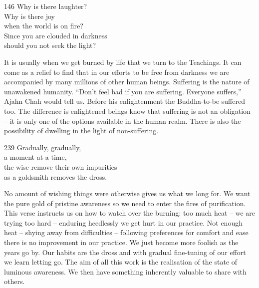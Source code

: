 
\begin{dhpVerse}{146}
\label{dhp-146}
Why is there laughter?\\
Why is there joy\\
when the world is on fire?\\
Since you are clouded in darkness\\
should you not seek the light?
\end{dhpVerse}

\begin{dhpRefl}

It is usually when we get burned by life that we turn to the
Teachings. It can come as a relief to find that in our efforts to be
free from darkness we are accompanied by many millions of other human
beings. Suffering is the nature of unawakened humanity. ``Don't feel
bad if you are suffering. Everyone suffers,'' Ajahn Chah would tell
us. Before his enlightenment the Buddha-to-be suffered too. The
difference is enlightened beings know that suffering is not an
obligation -- it is only one of the options available in the human
realm. There is also the possibility of dwelling in the light of
non-suffering.

\end{dhpRefl}


\begin{dhpVerse}{239}
\label{dhp-239}
Gradually, gradually,\\
a moment at a time,\\
the wise remove their own impurities\\
as a goldsmith removes the dross.
\end{dhpVerse}

\begin{dhpRefl}

No amount of wishing things were otherwise gives us what we long for.
We want the pure gold of pristine awareness so we need to enter the
fires of purification. This verse instructs us on how to watch over
the burning: too much heat -- we are trying too hard -- enduring
heedlessly we get hurt in our practice. Not enough heat -- shying
away from difficulties -- following preferences for comfort and ease
there is no improvement in our practice. We just become more foolish
as the years go by. Our habits are the dross and with gradual
fine-tuning of our effort we learn letting go. The aim of all this
work is the realisation of the state of luminous awareness. We then
have something inherently valuable to share with others.

\end{dhpRefl}


